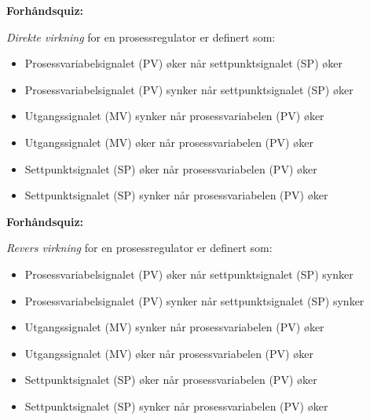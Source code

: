 \vfil \eject

\noindent
{\bf Forhåndsquiz:}

{\it Direkte virkning} for en prosessregulator er definert som:

\begin{itemize}
\item{} Prosessvariabelsignalet (PV) øker når settpunktsignalet (SP) øker
\vskip 5pt
\item{} Prosessvariabelsignalet (PV) synker når settpunktsignalet (SP) øker
\vskip 5pt
\item{} Utgangssignalet (MV) synker når prosessvariabelen (PV) øker
\vskip 5pt
\item{} Utgangssignalet (MV) øker når prosessvariabelen (PV) øker
\vskip 5pt
\item{} Settpunktsignalet (SP) øker når prosessvariabelen (PV) øker
\vskip 5pt
\item{} Settpunktsignalet (SP) synker når prosessvariabelen (PV) øker
\end{itemize}


\vfil \eject

\noindent
{\bf Forhåndsquiz:}

{\it Revers virkning} for en prosessregulator er definert som:

\begin{itemize}
\item{} Prosessvariabelsignalet (PV) øker når settpunktsignalet (SP) synker
\vskip 5pt
\item{} Prosessvariabelsignalet (PV) synker når settpunktsignalet (SP) synker
\vskip 5pt
\item{} Utgangssignalet (MV) synker når prosessvariabelen (PV) øker
\vskip 5pt
\item{} Utgangssignalet (MV) øker når prosessvariabelen (PV) øker
\vskip 5pt
\item{} Settpunktsignalet (SP) øker når prosessvariabelen (PV) øker
\vskip 5pt
\item{} Settpunktsignalet (SP) synker når prosessvariabelen (PV) øker
\end{itemize}



